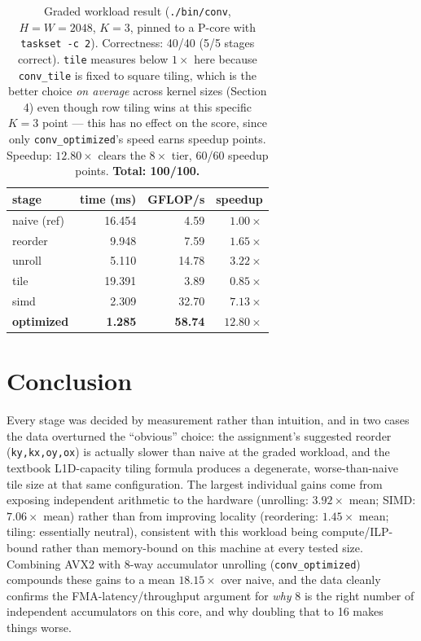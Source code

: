 \documentclass[11pt]{article}
\begin{document}
\begin{table}[H]
\centering
\begin{tabular}{lrrr}
\toprule
stage & time (ms) & GFLOP/s & speedup \\
\midrule
naive (ref) & 16.454 & 4.59 & $1.00\times$ \\
reorder     & 9.948  & 7.59 & $1.65\times$ \\
unroll      & 5.110  & 14.78 & $3.22\times$ \\
tile        & 19.391 & 3.89 & $0.85\times$ \\
simd        & 2.309  & 32.70 & $7.13\times$ \\
\textbf{optimized} & \textbf{1.285} & \textbf{58.74} & \textbf{$12.80\times$} \\
\bottomrule
\end{tabular}
\caption{Graded workload result (\texttt{./bin/conv}, $H{=}W{=}2048$, $K{=}3$, pinned to a
P-core with \texttt{taskset -c 2}). Correctness: 40/40 (5/5 stages correct). \texttt{tile}
measures below $1\times$ here because \texttt{conv\_tile} is fixed to square tiling, which
is the better choice \emph{on average} across kernel sizes (Section 4) even though row
tiling wins at this specific $K{=}3$ point --- this has no effect on the score, since only
\texttt{conv\_optimized}'s speed earns speedup points. Speedup: $12.80\times$ clears the
$8\times$ tier, 60/60 speedup points. \textbf{Total: 100/100.}}
\end{table}

\section{Conclusion}

Every stage was decided by measurement rather than intuition, and in two cases the data
overturned the ``obvious'' choice: the assignment's suggested reorder
(\texttt{ky,kx,oy,ox}) is actually slower than naive at the graded workload, and the
textbook L1D-capacity tiling formula produces a degenerate, worse-than-naive tile size at
that same configuration. The largest individual gains come from exposing independent
arithmetic to the hardware (unrolling: $3.92\times$ mean; SIMD: $7.06\times$ mean) rather
than from improving locality (reordering: $1.45\times$ mean; tiling: essentially neutral),
consistent with this workload being compute/ILP-bound rather than memory-bound on this
machine at every tested size. Combining AVX2 with 8-way accumulator unrolling
(\texttt{conv\_optimized}) compounds these gains to a mean $18.15\times$ over naive, and the
data cleanly confirms the FMA-latency/throughput argument for \emph{why} 8 is the right
number of independent accumulators on this core, and why doubling that to 16 makes things
worse.
\end{document}
